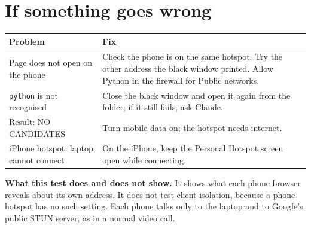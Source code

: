\documentclass[11pt,a4paper]{article}
\begin{document}
\section*{If something goes wrong}
\begin{tabularx}{\textwidth}{@{}p{5.2cm}Y@{}}
\toprule
\textbf{Problem} & \textbf{Fix} \\
\midrule
Page does not open on the phone & Check the phone is on the same hotspot. Try the other address the black window printed. Allow Python in the firewall for Public networks. \\
\texttt{python} is not recognised & Close the black window and open it again from the folder; if it still fails, ask Claude. \\
Result: NO CANDIDATES & Turn mobile data on; the hotspot needs internet. \\
iPhone hotspot: laptop cannot connect & On the iPhone, keep the Personal Hotspot screen open while connecting. \\
\bottomrule
\end{tabularx}

\vspace{6pt}
\textbf{What this test does and does not show.} It shows what each phone browser reveals about its own address. It does not test client isolation, because a phone hotspot has no such setting. Each phone talks only to the laptop and to Google's public STUN server, as in a normal video call.
\end{document}

